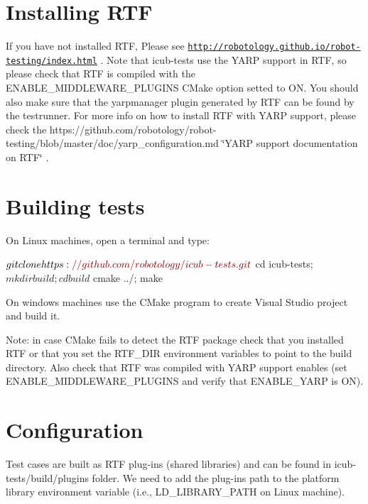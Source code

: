 \hypertarget{installation_installing_rtf}{}\section{Installing R\-T\-F}\label{installation_installing_rtf}
If you have not installed R\-T\-F, Please see \href{http://robotology.github.io/robot-testing/index.html}{\tt http\-://robotology.\-github.\-io/robot-\/testing/index.\-html} . Note that {\ttfamily icub-\/tests} use the Y\-A\-R\-P support in R\-T\-F, so please check that R\-T\-F is compiled with the {\ttfamily E\-N\-A\-B\-L\-E\-\_\-\-M\-I\-D\-D\-L\-E\-W\-A\-R\-E\-\_\-\-P\-L\-U\-G\-I\-N\-S} C\-Make option setted to O\-N. You should also make sure that the yarpmanager plugin generated by R\-T\-F can be found by the testrunner. For more info on how to install R\-T\-F with Y\-A\-R\-P support, please check the https\-://github.com/robotology/robot-\/testing/blob/master/doc/yarp\-\_\-configuration.\-md \char`\"{}\-Y\-A\-R\-P support documentation on R\-T\-F\char`\"{} .\hypertarget{installation_building_tests}{}\section{Building tests}\label{installation_building_tests}
On Linux machines, open a terminal and type\-: 
\begin{DoxyCode}
$ git clone https:\textcolor{comment}{//github.com/robotology/icub-tests.git}
$ cd icub-tests; 
$ mkdir build; cd build
$ cmake ../; make
\end{DoxyCode}


On windows machines use the C\-Make program to create Visual Studio project and build it.

Note\-: in case C\-Make fails to detect the R\-T\-F package check that you installed R\-T\-F or that you set the R\-T\-F\-\_\-\-D\-I\-R environment variables to point to the build directory. Also check that R\-T\-F was compiled with Y\-A\-R\-P support enables (set {\ttfamily E\-N\-A\-B\-L\-E\-\_\-\-M\-I\-D\-D\-L\-E\-W\-A\-R\-E\-\_\-\-P\-L\-U\-G\-I\-N\-S} and verify that {\ttfamily E\-N\-A\-B\-L\-E\-\_\-\-Y\-A\-R\-P} is O\-N).\hypertarget{installation_soncifugration}{}\section{Configuration}\label{installation_soncifugration}
Test cases are built as R\-T\-F plug-\/ins (shared libraries) and can be found in {\ttfamily icub-\/tests/build/plugins} folder. We need to add the plug-\/ins path to the platform library environment variable (i.\-e., {\ttfamily L\-D\-\_\-\-L\-I\-B\-R\-A\-R\-Y\-\_\-\-P\-A\-T\-H} on Linux machine).


